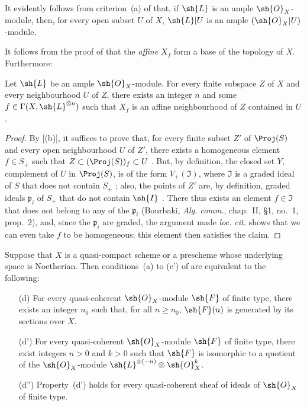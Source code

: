 It evidently follows from criterion~(a) of  that, if $\sh{L}$ is an ample $\sh{O}_X$-module, then, for every open subset $U$ of $X$, $\sh{L}|U$ is an ample $(\sh{O}_X|U)$-module.

It follows from the proof of  that the \emph{affine} $X_f$ form a base of the topology of $X$.
Furthermore:

\begin{corollary}[4.5.4]
\label{II.4.5.4}
Let $\sh{L}$ be an ample $\sh{O}_X$-module.
For every finite subspace $Z$ of $X$ and every neighbourhood $U$ of $Z$, there exists an integer $n$ and some $f\in\Gamma(X,\sh{L}^{\otimes n})$ such that $X_f$ is an affine neighbourhood of $Z$ contained in $U$.
\end{corollary}

\begin{proof}
By [(b)], it suffices to prove that, for every finite subset $Z'$ of $\Proj(S)$ and every open neighbourhood $U$ of $Z'$, there exists a homogeneous element $f\in S_+$ such that $Z\subset(\Proj(S))_f\subset U$ .
But, by definition, the closed set $Y$, complement of $U$ in $\Proj(S)$, is of the form $V_+(\mathfrak{I})$, where $\mathfrak{I}$ is a graded ideal of $S$ that does not contain $S_+$ ;
also, the points of $Z'$ are, by definition, graded ideals $\mathfrak{p}_i$ of $S_+$ that do not contain $\sh{I}$ .
There thus exists an element $f\in\mathfrak{I}$ that does not belong to any of the $\mathfrak{p}_i$ (Bourbaki, \emph{Alg. comm.}, chap.~II, \S1, no.~1, prop.~2), and, since the $\mathfrak{p}_i$ are graded, the argument made \emph{loc. cit.} shows that we can even take $f$ to be homogeneous;
this element then satisfies the claim.
\end{proof}

\begin{proposition}[4.5.5]
\label{II.4.5.5}
Suppose that $X$ is a quasi-compact scheme or a prescheme whose underlying space is Noetherian.
Then conditions~(a) to (c') of  are equivalent to the following:
\begin{enumerate}
  \item[\rm{(d)}] For every quasi-coherent $\sh{O}_X$-module $\sh{F}$ of finite type, there exists an integer $n_0$ such that, for all $n\geq n_0$, $\sh{F}(n)$ is generated by its sections over $X$.
  \item[\rm{(d')}] For every quasi-coherent $\sh{O}_X$-module $\sh{F}$ of finite type, there exist integers $n>0$ and $k>0$ such that $\sh{F}$ is isomorphic to a quotient of the $\sh{O}_X$-module $\sh{L}^{\otimes(-n)}\otimes\sh{O}_X^k$.
  \item[\rm{(d'')}] Property~(d') holds for every quasi-coherent sheaf of ideals of $\sh{O}_X$ of finite type.
\end{enumerate}
\end{proposition}

